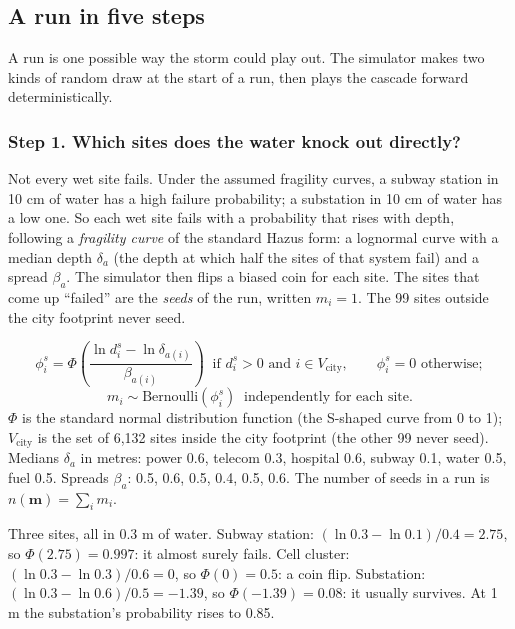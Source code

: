 \documentclass[11pt]{article}
\begin{document}
\subsection{A run in five steps}

A run is one possible way the storm could play out. The simulator makes two kinds of random draw at the start of a run, then plays the cascade forward deterministically.

\subsubsection*{Step 1. Which sites does the water knock out directly?}

Not every wet site fails. Under the assumed fragility curves, a subway station in 10 cm of water has a high failure probability; a substation in 10 cm of water has a low one. So each wet site fails with a probability that rises with depth, following a \emph{fragility curve} of the standard Hazus form: a lognormal curve with a median depth $\delta_a$ (the depth at which half the sites of that system fail) and a spread $\beta_a$. The simulator then flips a biased coin for each site. The sites that come up ``failed'' are the \emph{seeds} of the run, written $m_i=1$. The 99 sites outside the city footprint never seed.

\begin{maths}
\[
\phi_i^s=\Phi\!\left(\frac{\ln d_i^s-\ln\delta_{a(i)}}{\beta_{a(i)}}\right)\ \text{ if } d_i^s>0 \text{ and } i\in V_{\mathrm{city}},\qquad \phi_i^s=0 \text{ otherwise};
\]
\[
m_i\sim\mathrm{Bernoulli}(\phi_i^s)\ \text{ independently for each site.}
\]
$\Phi$ is the standard normal distribution function (the S-shaped curve from 0 to 1); $V_{\mathrm{city}}$ is the set of 6,132 sites inside the city footprint (the other 99 never seed). Medians $\delta_a$ in metres: power 0.6, telecom 0.3, hospital 0.6, subway 0.1, water 0.5, fuel 0.5. Spreads $\beta_a$: 0.5, 0.6, 0.5, 0.4, 0.5, 0.6. The number of seeds in a run is $n(\mathbf m)=\sum_i m_i$.
\end{maths}

\begin{example}
Three sites, all in 0.3 m of water. Subway station: $(\ln 0.3-\ln 0.1)/0.4 = 2.75$, so $\Phi(2.75)=0.997$: it almost surely fails. Cell cluster: $(\ln 0.3-\ln 0.3)/0.6=0$, so $\Phi(0)=0.5$: a coin flip. Substation: $(\ln 0.3-\ln 0.6)/0.5=-1.39$, so $\Phi(-1.39)=0.08$: it usually survives. At 1 m the substation's probability rises to 0.85.
\end{example}
\end{document}

